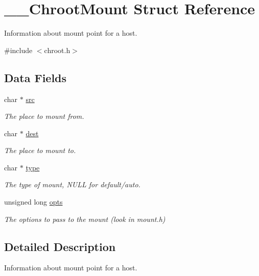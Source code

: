 \hypertarget{struct_____chroot_mount}{}\section{\+\_\+\+\_\+\+Chroot\+Mount Struct Reference}
\label{struct_____chroot_mount}


Information about mount point for a host.  




{\ttfamily \#include $<$chroot.\+h$>$}

\subsection*{Data Fields}
\begin{DoxyCompactItemize}
\item 
char $\ast$ \mbox{\hyperlink{struct_____chroot_mount_a1853f747ee2cf7e6e33d34d8c5d598d6}{src}}
\begin{DoxyCompactList}\small\item\em The place to mount from. \end{DoxyCompactList}\item 
char $\ast$ \mbox{\hyperlink{struct_____chroot_mount_a03470e5202cc10763f9260fac2781aed}{dest}}
\begin{DoxyCompactList}\small\item\em The place to mount to. \end{DoxyCompactList}\item 
char $\ast$ \mbox{\hyperlink{struct_____chroot_mount_a184d760509dc0e1b485124d2f31d6889}{type}}
\begin{DoxyCompactList}\small\item\em The type of mount, N\+U\+LL for default/auto. \end{DoxyCompactList}\item 
unsigned long \mbox{\hyperlink{struct_____chroot_mount_a301ce607b0f62e7c5cc1caed898e6b93}{opts}}
\begin{DoxyCompactList}\small\item\em The options to pass to the mount (look in mount.\+h) \end{DoxyCompactList}\end{DoxyCompactItemize}


\subsection{Detailed Description}
Information about mount point for a host. 

